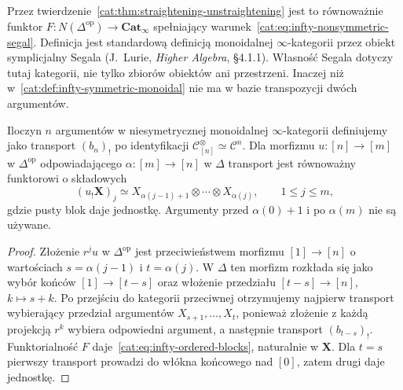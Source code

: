 Przez twierdzenie~\ref{cat:thm:straightening-unstraightening} jest to równoważnie funktor $F:N(\Delta^{\mathrm{op}})\to\mathbf{Cat}_{\infty}$ spełniający warunek~\eqref{cat:eq:infty-nonsymmetric-segal}. Definicja jest standardową definicją monoidalnej $\infty$-kategorii przez obiekt symplicjalny Segala (J.~Lurie, \emph{Higher Algebra}, \S4.1.1). Własność Segala dotyczy tutaj kategorii, nie tylko zbiorów obiektów ani przestrzeni. Inaczej niż w~\ref{cat:def:infty-symmetric-monoidal} nie ma w bazie transpozycji dwóch argumentów.

\begin{stwierdzenie}\label{cat:prop:infty-nonsymmetric-transport}
Iloczyn $n$ argumentów w niesymetrycznej monoidalnej $\infty$-kategorii definiujemy jako transport $(b_n)_!$ po identyfikacji $\mathcal C^\otimes_{[n]}\simeq\mathcal C^n$. Dla morfizmu $u:[n]\to[m]$ w $\Delta^{\mathrm{op}}$ odpowiadającego $\alpha:[m]\to[n]$ w $\Delta$ transport jest równoważny funktorowi o składowych
\begin{equation}\label{cat:eq:infty-ordered-blocks}
 (u_!\mathbf X)_j\simeq
 X_{\alpha(j-1)+1}\otimes\cdots\otimes X_{\alpha(j)},
 \qquad 1\leq j\leq m,
\end{equation}
gdzie pusty blok daje jednostkę. Argumenty przed $\alpha(0)+1$ i po $\alpha(m)$ nie są używane.
\end{stwierdzenie}
\begin{proof}
Złożenie $r^j u$ w $\Delta^{\mathrm{op}}$ jest przeciwieństwem morfizmu $[1]\to[n]$ o wartościach $s=\alpha(j-1)$ i $t=\alpha(j)$. W $\Delta$ ten morfizm rozkłada się jako wybór końców $[1]\to[t-s]$ oraz włożenie przedziału $[t-s]\to[n]$, $k\mapsto s+k$. Po przejściu do kategorii przeciwnej otrzymujemy najpierw transport wybierający przedział argumentów $X_{s+1},\ldots,X_t$, ponieważ złożenie z każdą projekcją $r^k$ wybiera odpowiedni argument, a następnie transport $(b_{t-s})_!$. Funktorialność $F$ daje~\eqref{cat:eq:infty-ordered-blocks}, naturalnie w $\mathbf X$. Dla $t=s$ pierwszy transport prowadzi do włókna końcowego nad $[0]$, zatem drugi daje jednostkę.
\end{proof}

